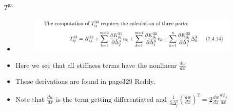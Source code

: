 	\begin{frame}{$T^{33}$}
		\begin{itemize}
			\item %
			\begin{figure}
				\centering
				\includegraphics[width=0.8\linewidth]{Figure/10}
				\label{fig:10}
			\end{figure}
			\item Here we see that all stiffness terms have the nonlinear $\frac{dw}{dx}$
			\item These derivations are found in page329 Reddy.
			\item Note that $\frac{dw}{dx}$ is the term getting differentiated and $\frac{1}{\partial \Delta^{3}_j} (\frac{dw}{dx})^{2} =  2\frac{dw}{dx} \frac{d \phi_j}{dx}$		
			
		\end{itemize}
	\end{frame}

